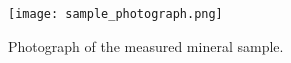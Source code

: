 \documentclass[preprint,11pt]{elsarticle}
\begin{document}
\begin{figure}[!htb]
    \centering
    \texttt{[image: sample\_photograph.png]}
    \caption{Photograph of the measured mineral sample.}
\end{figure}






\end{document}
